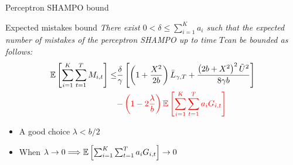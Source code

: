\documentclass{beamer}
\begin{document}
%


\begin{frame}{Perceptron SHAMPO   bound }
\begin{block}{Expected mistakes bound}
\emph{There exist $0<\delta\le\sum_{i=1}^Ka_{i  }$ such that the expected  number of mistakes  of the  perceptron SHAMPO  up to time $T$can be bounded as follows:}
\begin{displaymath}
\begin{split}
\mathbb{E}\left[ \sum_{i=1}^{K}\sum_{t=1}^{T}{M_{i,t}} \right]
\le& \frac{\delta}{\gamma}\left[{\left(1+\frac{X^2}{2b} \right){\bar L}_{\gamma,T}+
\frac{\left({2b+X^2}\right)^2\tilde{U}^2}{8{\gamma}b}}\right]\\
&\textcolor{red}{-\left({1-2\frac{\lambda}{b}}\right)\mathbb{E}\left[{\sum_{i=1}^{K}\sum_{t=1}^{T}{a_iG_{i,t}}}\right]}~
\end{split}
\end{displaymath}
\end{block}
\begin{itemize}
\item A good choice $\lambda<b/2 $\newline
\item When $\lambda\rightarrow0\Longrightarrow\mathbb{E}\left[{\sum_{i=1}^{K}\sum_{t=1}^{T}{a_iG_{i,t}}}\right]\rightarrow0$
\end{itemize}
\end{frame}
\end{document}
